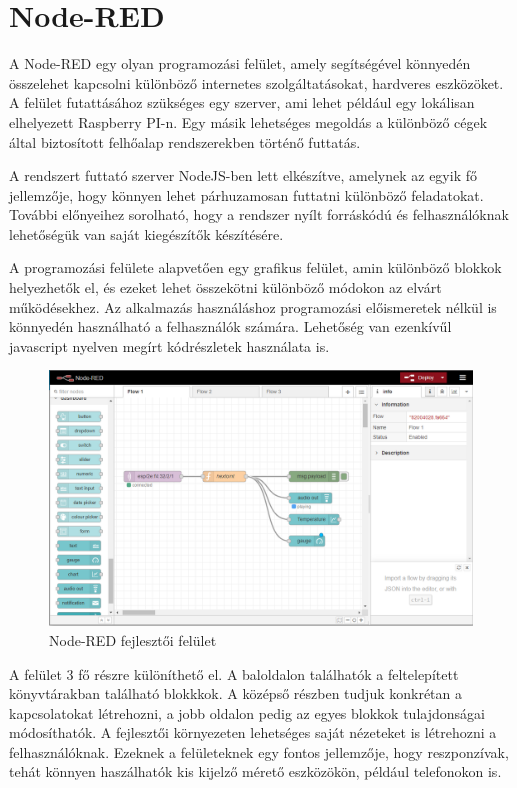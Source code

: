 \clearpage
\section{Node-RED} \label{nodred-section}
A Node-RED egy olyan programozási felület, amely segítségével könnyedén összelehet kapcsolni különböző internetes szolgáltatásokat, hardveres eszközöket. A felület futattásához szükséges egy szerver, ami lehet például egy lokálisan elhelyezett Raspberry PI-n. Egy másik lehetséges megoldás a különböző cégek által biztosított felhőalap rendszerekben történő futtatás.

A rendszert futtató szerver NodeJS-ben lett elkészítve, amelynek az egyik fő jellemzője, hogy könnyen lehet párhuzamosan futtatni különböző feladatokat. További előnyeihez sorolható, hogy a rendszer nyílt forráskódú és felhasználóknak lehetőségük van saját kiegészítők készítésére.

A programozási felülete alapvetően egy grafikus felület, amin különböző blokkok helyezhetők el, és ezeket lehet összekötni különböző módokon az elvárt működésekhez. Az alkalmazás használáshoz programozási előismeretek nélkül is könnyedén használható a felhasználók számára. Lehetőség van ezenkívűl javascript nyelven megírt kódrészletek használata is.

\begin{figure}[!ht]
    \centering
    \includegraphics[width=150mm, keepaspectratio]{figures/nodered.png}
    \caption{Node-RED fejlesztői felület}
    \label{fig:nodered_development}
\end{figure}

A felület 3 fő részre különíthető el. A baloldalon találhatók a feltelepített könyvtárakban található blokkkok. A középső részben tudjuk konkrétan a kapcsolatokat létrehozni, a jobb oldalon pedig az egyes blokkok tulajdonságai módosíthatók. A fejlesztői környezeten lehetséges saját nézeteket is létrehozni a felhasználóknak. Ezeknek a felületeknek egy fontos jellemzője, hogy reszponzívak, tehát könnyen haszálhatók kis kijelző mérető eszközökön, például telefonokon is.

